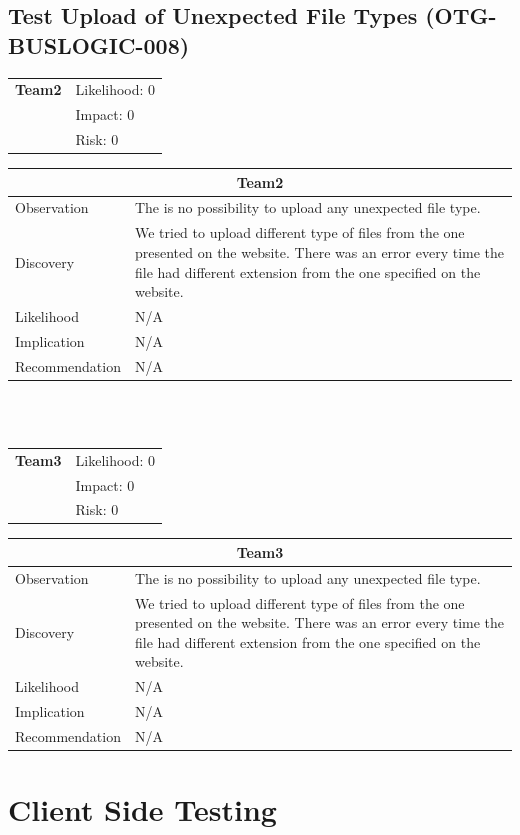 \documentclass[headsepline,footsepline,footinclude=false,oneside,fontsize=11pt,paper=a4,listof=totoc,bibliography=totoc]{scrbook} %
\begin{document}
\pagebreak
\subsection{Test Upload of Unexpected File Types (OTG-BUSLOGIC-008) }
\begin{tabular}{cR{12cm}}
	\textbf{Team2} & Likelihood: 0\\& Impact: 0\\& Risk: 0
\end{tabular}

\begin{tabular}{ l|p{11cm}  }
	\hline
	\multicolumn{2}{c}{\textbf{Team2}} \\
	\hline
	Observation   & The is no possibility to upload any unexpected file type.  \\
	Discovery  & We tried to upload different type of files from the one presented on the website. There was an error every time the file had different extension from the one specified on the website.  \\
	Likelihood &  N/A \\
	Implication    & N/A \\
	Recommendation & N/A \\
	\hline
\end{tabular}
\\
\vspace{0.5cm}
\\
\begin{tabular}{cR{12cm}}
	\textbf{Team3} & Likelihood: 0\\& Impact: 0\\& Risk: 0
\end{tabular}

\begin{tabular}{ l|p{11cm}  }
	\hline
	\multicolumn{2}{c}{\textbf{Team3}} \\
	\hline
	Observation   & The is no possibility to upload any unexpected file type.  \\
	Discovery  & We tried to upload different type of files from the one presented on the website. There was an error every time the file had different extension from the one specified on the website.  \\
	Likelihood &  N/A \\
	Implication    & N/A \\
	Recommendation & N/A \\
	\hline
\end{tabular}
\pagebreak
 
\section{Client Side Testing}
\end{document}
